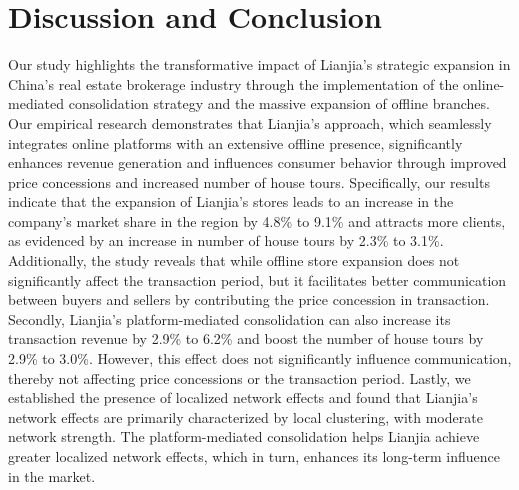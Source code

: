 \documentclass[11pt]{article}
\begin{document}
\section{Discussion and Conclusion} \label{sec:conclusion}

Our study highlights the transformative impact of Lianjia's strategic expansion in China's real estate brokerage industry through the implementation of the online-mediated consolidation strategy and the massive expansion of offline branches. Our empirical research demonstrates that Lianjia's approach, which seamlessly integrates online platforms with an extensive offline presence, significantly enhances revenue generation and influences consumer behavior through improved price concessions and increased number of house tours. Specifically, our results indicate that the expansion of Lianjia's stores leads to an increase in the company's market share in the region by 4.8\% to 9.1\% and attracts more clients, as evidenced by an increase in number of house tours by 2.3\% to 3.1\%. Additionally, the study reveals that while offline store expansion does not significantly affect the transaction period, but it facilitates better communication between buyers and sellers by contributing the price concession in transaction. Secondly, Lianjia's platform-mediated consolidation can also increase its transaction revenue by 2.9\% to 6.2\% and boost the number of house tours by 2.9\% to 3.0\%. However, this effect does not significantly influence communication, thereby not affecting price concessions or the transaction period. Lastly, we established the presence of localized network effects and found that Lianjia's network effects are primarily characterized by local clustering, with moderate network strength. The platform-mediated consolidation helps Lianjia achieve greater localized network effects, which in turn, enhances its long-term influence in the market.
\end{document}
